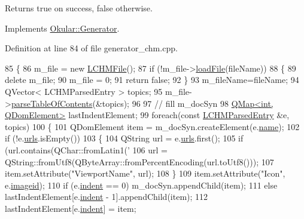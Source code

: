 \begin{DoxyReturn}{Returns}
true on success, false otherwise. 
\end{DoxyReturn}


Implements \hyperlink{classOkular_1_1Generator_a388b47328a5297d53cdbdc6fcf074ee3}{Okular\+::\+Generator}.



Definition at line 84 of file generator\+\_\+chm.\+cpp.


\begin{DoxyCode}
85 \{
86     m\_file = \textcolor{keyword}{new} \hyperlink{classLCHMFile}{LCHMFile}();
87     \textcolor{keywordflow}{if} (!m\_file->\hyperlink{classLCHMFile_a99187b66c1ad404bd77382b93c5c4a79}{loadFile}(fileName))
88     \{
89         \textcolor{keyword}{delete} m\_file;
90         m\_file = 0;
91         \textcolor{keywordflow}{return} \textcolor{keyword}{false};
92     \}
93     m\_fileName=fileName;
94     QVector< LCHMParsedEntry > topics;
95     m\_file->\hyperlink{classLCHMFile_a28d69103c40a289a41ef8f56e5f63eca}{parseTableOfContents}(&topics);
96     
97     \textcolor{comment}{// fill m\_docSyn}
98     \hyperlink{classQMap}{QMap<int, QDomElement>} lastIndentElement;
99     \textcolor{keywordflow}{foreach}(\textcolor{keyword}{const} \hyperlink{structLCHMParsedEntry}{LCHMParsedEntry} &e, topics)
100     \{
101         QDomElement item = m\_docSyn.createElement(e.\hyperlink{structLCHMParsedEntry_a90196da32bb2ed757f516caf583a6437}{name});
102         \textcolor{keywordflow}{if} (!e.\hyperlink{structLCHMParsedEntry_aa871a08e7fca4ae8e23983ff299bd24f}{urls}.isEmpty())
103         \{
104             QString url = e.\hyperlink{structLCHMParsedEntry_aa871a08e7fca4ae8e23983ff299bd24f}{urls}.first();
105             \textcolor{keywordflow}{if} (url.contains(QChar::fromLatin1(\textcolor{charliteral}{'%
106                 url = QString::fromUtf8(QByteArray::fromPercentEncoding(url.toUtf8()));
107             item.setAttribute(\textcolor{stringliteral}{"ViewportName"}, url);
108         \}
109         item.setAttribute(\textcolor{stringliteral}{"Icon"}, e.\hyperlink{structLCHMParsedEntry_aefeb9372238ddebc327350e1696ec901}{imageid});
110         \textcolor{keywordflow}{if} (e.\hyperlink{structLCHMParsedEntry_a33a145dba3dd4761f26b361dcf49017b}{indent} == 0) m\_docSyn.appendChild(item);
111         \textcolor{keywordflow}{else} lastIndentElement[e.\hyperlink{structLCHMParsedEntry_a33a145dba3dd4761f26b361dcf49017b}{indent} - 1].appendChild(item);
112         lastIndentElement[e.\hyperlink{structLCHMParsedEntry_a33a145dba3dd4761f26b361dcf49017b}{indent}] = item;
}
\end{DoxyCode}
